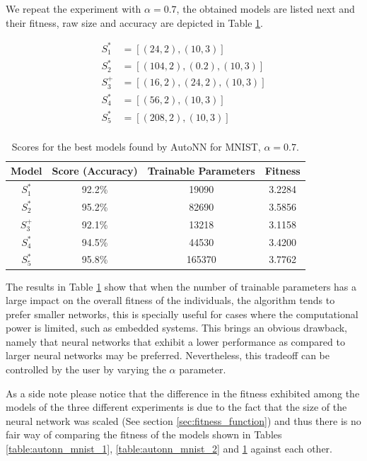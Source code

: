 \documentclass[journal]{IEEEtran}
\begin{document}
We repeat the experiment with $\alpha = 0.7$, the obtained models are listed next and their fitness, raw size and accuracy are depicted in Table \ref{table:autonn_mnist_3}.

\begin{align*}
S^*_1 & = \left[ (24, 2), (10, 3) \right] \\
S^*_2 & = \left[ (104, 2), (0.2), (10, 3) \right] \\
S^+_3 & = \left[ (16, 2), (24, 2), (10, 3) \right] \\
S^*_4 & = \left[ (56, 2), (10, 3) \right] \\
S^*_5 & = \left[ (208, 2),  (10, 3) \right] \\
\end{align*}

\begin{table}[!htb]
\begin{center}
\begin{tabular}{| c | c | c | c |}
\hline
Model & Score (Accuracy) & Trainable Parameters & Fitness\\
\hline
$S^*_1$ & 92.2\% & 19090 & 3.2284\\
$S^*_2$ & 95.2\% & 82690 & 3.5856\\
$S^+_3$ & 92.1\% & 13218 & 3.1158\\
$S^*_4$ & 94.5\% & 44530 & 3.4200\\
$S^*_5$ & 95.8\% & 165370 & 3.7762\\
\hline
\end{tabular}
\end{center}
\caption{Scores for the best models found by AutoNN for MNIST, $\alpha = 0.7$.}
\label{table:autonn_mnist_3}
\end{table}

The results in Table \ref{table:autonn_mnist_3} show that when the number of trainable parameters has a large impact on the overall fitness of the individuals, the algorithm tends to prefer smaller networks, this is specially useful for cases where the computational power is limited, such as embedded systems. This brings an obvious drawback, namely that neural networks that exhibit a lower performance as compared to larger neural networks may be preferred. Nevertheless, this tradeoff can be controlled by the user by varying the $\alpha$ parameter. 

As a side note please notice that the difference in the fitness exhibited among the models of the three different experiments is due to the fact that the size of the neural network was scaled (See section \ref{sec:fitness_function}) and thus there is no fair way of comparing the fitness of the models shown in Tables \ref{table:autonn_mnist_1}, \ref{table:autonn_mnist_2} and \ref{table:autonn_mnist_3} against each other.
\end{document}
